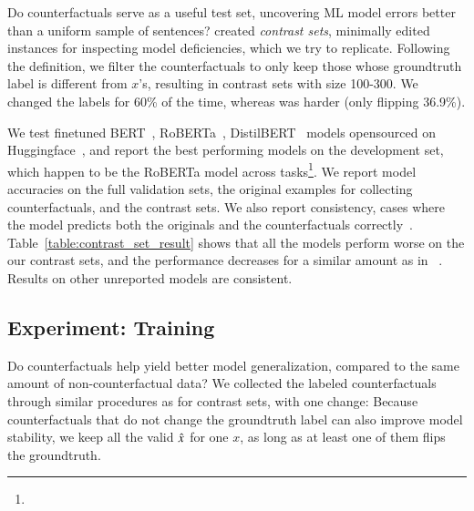 \TableAugSST
\TableAugNLI
Do \sysname counterfactuals serve as a useful test set, uncovering ML model errors better than a uniform sample of sentences?
\citet{gardner2020contrast} created \emph{contrast sets}, \ie minimally edited instances for inspecting model deficiencies, which we try to replicate.
Following the definition, we filter the counterfactuals to only keep those whose groundtruth label is different from $x$'s, resulting in contrast sets with size 100-300.
We changed the \nli labels for 60\% of the time, whereas \sst was harder (only flipping 36.9\%).

We test finetuned BERT~\cite{devlin-etal-2019-bert}, RoBERTa~\cite{liu2019roberta},  DistilBERT~\cite{Sanh2019DistilBERTAD} models opensourced on Huggingface~\cite{Wolf2019HuggingFacesTS}, and report the best performing models on the development set, which happen to be the RoBERTa model across tasks\footnote{
}.
We report model accuracies on the full validation sets, the original examples for collecting counterfactuals, and the contrast sets.
We also report consistency, \ie cases where the model predicts both the originals and the counterfactuals correctly~\cite{li2020linguistically}.
Table~\ref{table:contrast_set_result} shows that all the models perform worse on the our contrast sets, and the performance decreases for a similar amount as in ~\cite{gardner2020contrast}.
Results on other unreported models are consistent.


\subsection{Experiment: Training}

\label{subsec:augmentation}
Do \sysname counterfactuals help yield better model generalization, compared to the same amount of non-counterfactual data? 
We collected the labeled counterfactuals through similar procedures as for contrast sets, with one change:
Because counterfactuals that do not change the groundtruth label can also improve model stability, we keep all the valid $\hat{x}$ for one $x$, as long as at least one of them flips the groundtruth.

